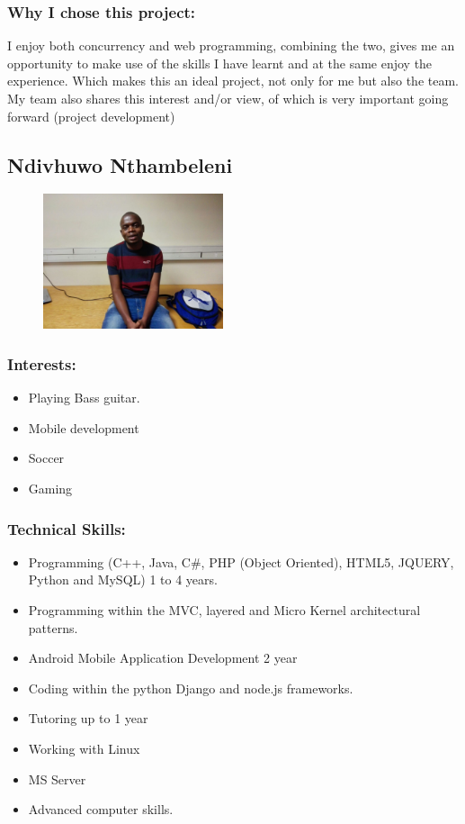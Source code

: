 \subsubsection{Why I chose this project:}
\par{I enjoy both concurrency and web programming, combining the two, gives me an opportunity to make use of the skills I have learnt and at the same enjoy the experience. Which makes this an ideal project, not only for me but also the team. My team also shares this interest and/or view, of which is very important going forward (project development)
}
\newpage
\subsection{Ndivhuwo Nthambeleni}
\begin{figure}[h]
			\center
			\includegraphics[width=200px]{images/Ndivhuwo.jpg}
\end{figure}
\subsubsection{Interests:}
\begin{itemize}
		\item Playing Bass guitar.
		\item Mobile development
		\item Soccer
		\item Gaming
	\end{itemize}

\subsubsection{Technical Skills:}
\begin{itemize}
		\item Programming (C++, Java, C\#, PHP (Object Oriented), HTML5, JQUERY, Python and MySQL) 1 to 4 years.
		\item Programming within the MVC, layered and Micro Kernel architectural patterns.
		\item Android Mobile Application Development 2 year
		\item Coding within the python Django and node.js frameworks.
		\item Tutoring up to 1 year
		\item Working with Linux 
		\item MS Server
		\item Advanced computer skills.
	\end{itemize}

